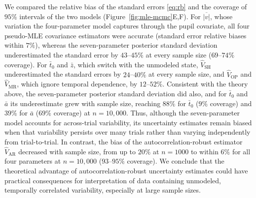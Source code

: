 \documentclass[00-main.tex]{subfiles}
\begin{document}
We compared the relative bias of the standard errors \eqref{eq:rb} and the coverage of $95\%$ intervals of the two models (Figure~\ref{fig:mle-mcmc}E,F). For $\overline{|v|}$, whose variation the four-parameter model captures through the pupil covariate, all four pseudo-MLE covariance estimators were accurate (standard error relative biases within $7\%$), whereas the seven-parameter posterior standard deviation underestimated the standard error by $43$--$45\%$ at every sample size ($69$--$74\%$ coverage). For $\bar{t}_0$ and $\bar{z}$, which switch with the unmodeled state, $\widehat{V}_\text{SH}$ underestimated the standard errors by $24$--$40\%$ at every sample size, and $\widehat{V}_\text{OP}$ and $\widehat{V}_\text{MR}$, which ignore temporal dependence, by $12$--$52\%$. Consistent with the theory above, the seven-parameter posterior standard deviation did also, and for $\bar{t}_0$ and $\bar{a}$ its underestimate grew with sample size, reaching $88\%$ for $\bar{t}_0$ ($9\%$ coverage) and $39\%$ for $\bar{a}$ ($69\%$ coverage) at $n=10{,}000$. Thus, although the seven-parameter model accounts for across-trial variability, its uncertainty estimates remain biased when that variability persists over many trials rather than varying independently from trial-to-trial.  In contrast, the bias of the autocorrelation-robust estimator $\widehat{V}_\text{AR}$ decreased with sample size, from up to $20\%$ at $n=1000$ to within $6\%$ for all four parameters at $n=10{,}000$ ($93$--$95\%$ coverage).  We conclude that the theoretical advantage of autocorrelation-robust uncertainty estimates could have practical consequences for interpretation of data containing unmodeled, temporally correlated variability, especially at large sample sizes.
\end{document}
